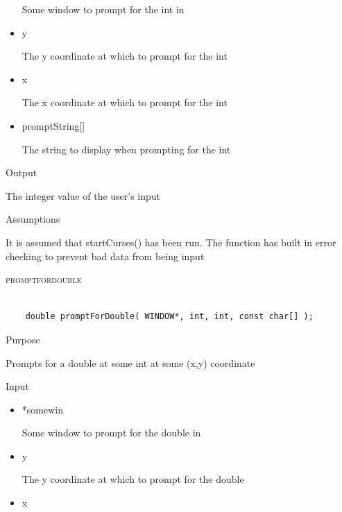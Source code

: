 \documentclass[pdftex, 11pt]{article}
\begin{document}
\begin{description}
\begin{description}
\begin{itemize}
						Some window to prompt for the int in

					\item{y}

						The y coordinate at which to prompt
						for the int

					\item{x} 

						The x coordinate at which to prompt
						for the int

					\item{promptString[]}

						The string to display when prompting for
						the int
						
				\end{itemize}

			\item{Output}

				The integer value of the user's input

			\item{Assumptions}

				It is assumed that startCurses() has been run.
				The function has built in error checking to prevent
				bad data from being input

		\end{description}


	\item{\textsc{promptfordouble}}

		\begin{lstlisting}

	double promptForDouble( WINDOW*, int, int, const char[] );
		\end{lstlisting}

		\begin{description}
			\item{Purpose}

				Prompts for a double at some int at some (x,y) coordinate

			\item{Input}

				\begin{itemize}

					\item{*somewin}

						Some window to prompt for the double in

					\item{y}

						The y coordinate at which to prompt
						for the double

					\item{x} 


\end{itemize}
\end{description}
\end{description}
\end{document}
